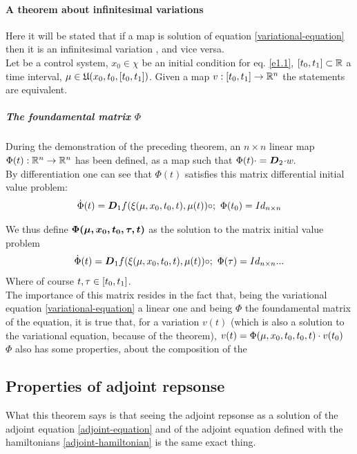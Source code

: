 \paragraph{A theorem about infinitesimal variations} 
Here it will be stated that if a map is solution of equation \ref{variational-equation} then it is an infinitesimal variation , and vice versa.\\
Let \controlSystem be a control system, $x_0\in\chi$ be an initial condition for eq. \ref{e1.1}, $[t_0,t_1]\subset\mathbb{R}$ a time interval, $\mu\in\mathfrak{U}(x_0,t_0,[t_0,t_1])$. Given a map $v:[t_0,t_1]\rightarrow\mathbb{R}^n$ the statements 
are equivalent. 

\subparagraph{The foundamental matrix $\Phi$} During the demonstration of the preceding theorem, an $n\times n$ linear map $\Phi(t):\mathbb{R}^n\rightarrow\mathbb{R}^n$ has been defined, as a map such that $\Phi(t)\cdot=\boldsymbol{D}_{2}$$\cdot w$. \\
By differentiation one can see that $\Phi(t)$ satisfies this matrix differential initial value problem:
\begin{gather*}
\dot{\Phi}(t)=\boldsymbol{D}_{1}f(\xi(\mu,x_0,t_0,t),\mu(t))\circ;\text{   	   }\Phi(t_0)=Id_{n\times n} 
\end{gather*}

We thus define $\boldsymbol{\Phi(\mu,x_0,t_0,\tau,t)} $ as the solution to the matrix initial value problem 
\begin{equation*}
	\dot{\Phi}(t)=\boldsymbol{D}_{1}f(\xi(\mu,x_0,t_0,t),\mu(t))\circ;\text{   	   }\Phi(\tau)=Id_{n\times n} ...
\end{equation*}
Where of course $t,\tau\in[t_0,t_1]$.\\

The importance of this matrix resides in the fact that, being the variational equation \ref{variational-equation} a linear one and being $\Phi$ the foundamental matrix of the equation, it is true that, for a variation $v(t)$ (which is also a solution to the variational equation, because of the theorem), $v(t)=\Phi(\mu,x_0,t_0,t_0,t)\cdot v(t_0)$\\
$\Phi$ also has some properties, about the composition of the 



\subsection{Properties of adjoint repsonse }
What this theorem says is that seeing the adjoint repsonse as a solution of the adjoint equation \ref{adjoint-equation} and of the adjoint equation defined with the hamiltonians \ref{adjoint-hamiltonian} is the same exact thing.


